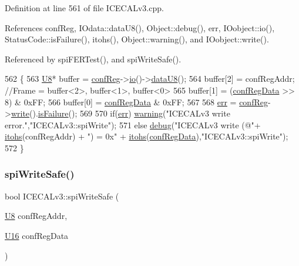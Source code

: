 Definition at line 561 of file I\+C\+E\+C\+A\+Lv3.\+cpp.



References conf\+Reg, I\+Odata\+::data\+U8(), Object\+::debug(), err, I\+Oobject\+::io(), Status\+Code\+::is\+Failure(), itohs(), Object\+::warning(), and I\+Oobject\+::write().



Referenced by spi\+F\+E\+R\+Test(), and spi\+Write\+Safe().


\begin{DoxyCode}
562 \{
563     \hyperlink{ICECALv3_8h_a3cb25ca6f51f003950f9625ff05536fc}{U8}* buffer = \hyperlink{classICECALv3_a6e8b6c03f5b0f1d8281bf8a0fa46064f}{confReg}->\hyperlink{classIOobject_af04fb94137c3d86849f478ac5afab5d1}{io}()->\hyperlink{classIOdata_a75e9c318dbac3a39402179070943d4bc}{dataU8}();
564     buffer[2] = confRegAddr;                                \textcolor{comment}{//Frame = buffer<2>, buffer<1>, buffer<0>}
565     buffer[1] = (\hyperlink{structconfRegData}{confRegData} >> 8) & 0xFF;
566     buffer[0] =  \hyperlink{structconfRegData}{confRegData}       & 0xFF;
567 
568     \hyperlink{classICECALv3_ad8989925ee5b3ff322d863ce6aaff0bd}{err} = \hyperlink{classICECALv3_a6e8b6c03f5b0f1d8281bf8a0fa46064f}{confReg}->\hyperlink{classIOobject_a9f6984bc9f0fadcf800f1be2523ac744}{write}().\hyperlink{classStatusCode_a5dd22dc6eb2c52fc4cabc58f6dea2eb7}{isFailure}();
569 
570     \textcolor{keywordflow}{if}(\hyperlink{classICECALv3_ad8989925ee5b3ff322d863ce6aaff0bd}{err})  \hyperlink{classObject_a65cd4fda577711660821fd2cd5a3b4c9}{warning}(\textcolor{stringliteral}{"ICECALv3 write error."},\textcolor{stringliteral}{"ICECALv3::spiWrite"});
571     \textcolor{keywordflow}{else}      \hyperlink{classObject_aac010553f022165573714b7014a15f0d}{debug}(\textcolor{stringliteral}{"ICECALv3 write (@"}+ \hyperlink{classICECALv3_a04b02e583f191bfce34d05132cd23834}{itohs}(confRegAddr) + \textcolor{stringliteral}{") = 0x"} + 
      \hyperlink{classICECALv3_a04b02e583f191bfce34d05132cd23834}{itohs}(\hyperlink{structconfRegData}{confRegData}),\textcolor{stringliteral}{"ICECALv3::spiWrite"});
572 \}
\end{DoxyCode}
\mbox{\label{classICECALv3_aa0b8358ea0be8e47a8aded5e1551787f}} 
\subsubsection{\texorpdfstring{spi\+Write\+Safe()}{spiWriteSafe()}}
{\footnotesize\ttfamily bool I\+C\+E\+C\+A\+Lv3\+::spi\+Write\+Safe (\begin{DoxyParamCaption}\item[{\hyperlink{ICECALv3_8h_a3cb25ca6f51f003950f9625ff05536fc}{U8}}]{conf\+Reg\+Addr,  }\item[{\hyperlink{ICECALv3_8h_adf928e51a60dba0df29d615401cc55a8}{U16}}]{conf\+Reg\+Data }\end{DoxyParamCaption})\hspace{0.3cm}{\ttfamily [private]}}



